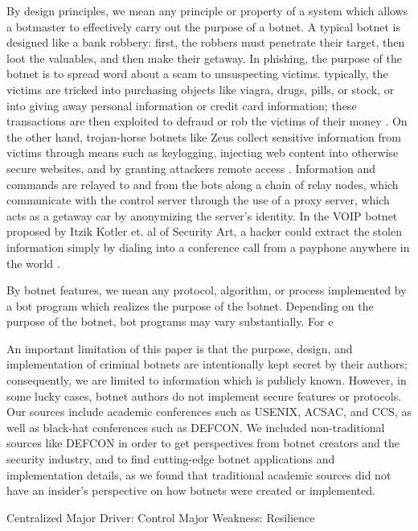 \documentclass{acm_proc_article-sp}
\begin{document}
By design principles, we mean any principle or property of a system which allows a botmaster to effectively carry out the purpose of a botnet.  A typical botnet is designed like a bank robbery: first, the robbers must penetrate their target, then loot the valuables, and then make their getaway. In phishing, the purpose of the botnet is to spread word about a scam to unsuspecting victims. typically, the victims are tricked into purchasing objects like viagra, drugs, pills, or stock, or into giving away personal information or credit card information; these transactions are then exploited to defraud or rob the victims of their money
\cite{defcon:javascript}
\cite{defcon:spam}
\cite{wikipedia:phishing}.  On the other hand, trojan-horse botnets like Zeus collect sensitive information from victims through means such as keylogging, injecting web content into otherwise secure websites, and by granting attackers remote access \cite{defcon:javascript}
\cite{blackhat:zeus}
\cite{defcon:spam}
\cite{wikipedia:trojan}. Information and commands are relayed to and from the bots along a chain of relay nodes, which communicate with the control server through the use of a proxy server, which acts as a getaway car by anonymizing the server’s identity.  In the VOIP botnet proposed by Itzik Kotler et. al of Security Art, a hacker could extract the stolen information simply by dialing into a conference call from a payphone anywhere in the world \cite{defcon:voip}.

By botnet features, we mean any protocol, algorithm, or process implemented by a bot program which realizes the purpose of the botnet.  Depending on the purpose of the botnet, bot programs may vary substantially.  For e

An important limitation of this paper is that the purpose, design, and implementation of criminal botnets are intentionally kept secret by their authors; consequently, we are limited to information which is publicly known. However, in some lucky cases, botnet authors do not implement secure features or protocols. Our sources include academic conferences such as USENIX, ACSAC,  and CCS, as well as black-hat conferences such as DEFCON.  We included non-traditional sources like DEFCON in order to get perspectives from botnet creators and the security industry, and to find cutting-edge botnet applications and implementation details, as we found that traditional academic sources did not have an insider’s perspective on how botnets were created or implemented.

Centralized
Major Driver: Control
Major Weakness: Resilience
\end{document}
